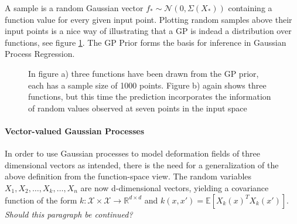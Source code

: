 A sample is a random Gaussian vector $f_{*} \sim \mathcal{N}(0, \Sigma(X_{*}))$ containing a function value for every given input point. Plotting random
samples above their input points is a nice way of illustrating that a GP is indead a distribution over functions, see figure \ref{fig:GPPlot}. The GP Prior forms the basis for inference in Gaussian Process Regression.

\begin{figure}[h!]
\caption{In figure a) three functions have been drawn from the GP prior, each has a sample size of 1000 points. Figure b) again shows three functions, but this time the prediction incorporates the information of random values observed at seven points in the input space}
\label{fig:GPPlot}
\end{figure}

\paragraph{Vector-valued Gaussian Processes}
In order to use Gaussian processes to model deformation fields of three dimensional vectors as intended, there is the need for a generalization of the above definition from the function-space view. The random variables $X_{1}, X_{2}, \ldots, X_{k}, \ldots, X_{n}$ are now d-dimensional vectors, yielding a covariance function of the form $k: \mathcal{X} \times \mathcal{X} \rightarrow \mathbb{R}^{d \times d}$ and $k(x,x')=\mathbb{E}[X_{k}(x)^{T}X_{k}(x')]$. \textit{Should this paragraph be continued?}

